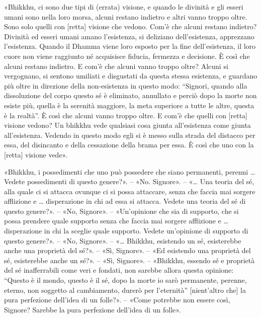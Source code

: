 

«Bhikkhu, ci sono due tipi di (errata) visione, e quando le divinità e
gli esseri umani sono nella loro morsa, alcuni restano indietro e altri
vanno troppo oltre. Sono solo quelli con [retta] visione che vedono.
Com’è che alcuni restano indietro? Divinità ed esseri umani amano
l’esistenza, si deliziano dell’esistenza, apprezzano l’esistenza. Quando
il Dhamma viene loro esposto per la fine dell’esistenza, il loro cuore
non viene raggiunto né acquisisce fiducia, fermezza e decisione. È così
che alcuni restano indietro. E com’è che alcuni vanno troppo oltre?
Alcuni si vergognano, si sentono umiliati e disgustati da questa stessa
esistenza, e guardano più oltre in direzione della non-esistenza in
questo modo: “Signori, quando alla dissoluzione del corpo questo sé è
eliminato, annullato e perciò dopo la morte non esiste più, quella è la
serenità maggiore, la meta superiore a tutte le altre, questa è la
realtà”. È così che alcuni vanno troppo oltre. E com’è che quelli con
[retta] visione vedono? Un bhikkhu vede qualsiasi cosa giunta
all’esistenza come giunta all’esistenza. Vedendo in questo modo egli si
è messo sulla strada del distacco per essa, del disincanto e della
cessazione della brama per essa. È così che uno con la [retta] visione
vede».




«Bhikkhu, i possedimenti che uno può possedere che siano permanenti,
perenni … Vedete possedimenti di questo genere?». – «No. Signore». – «…
Una teoria del sé, alla quale ci si attacca ovunque ci si possa
attaccare, senza che faccia mai sorgere afflizione e … disperazione in
chi ad essa si attacca. Vedete una teoria del sé di questo genere?». –
«No, Signore». – «Un’opinione che sia di supporto, che si possa prendere
quale supporto senza che faccia mai sorgere afflizione e … disperazione
in chi la sceglie quale supporto. Vedete un’opinione di supporto di
questo genere?». – «No, Signore». – «… Bhikkhu, esistendo un sé,
esisterebbe anche una proprietà del sé?». – «Sì, Signore». – «Ed
esistendo una proprietà del sé, esisterebbe anche un sé?». – «Sì,
Signore». – «Bhikkhu, essendo sé e proprietà del sé inafferrabili come
veri e fondati, non sarebbe allora questa opinione: “Questo è il mondo,
questo è il sé, dopo la morte io sarò permanente, perenne, eterno, non
soggetto al cambiamento, durerò per l’eternità” [nient’altro che] la
pura perfezione dell’idea di un folle?». – «Come potrebbe non essere
così, Signore? Sarebbe la pura perfezione dell’idea di un folle».


